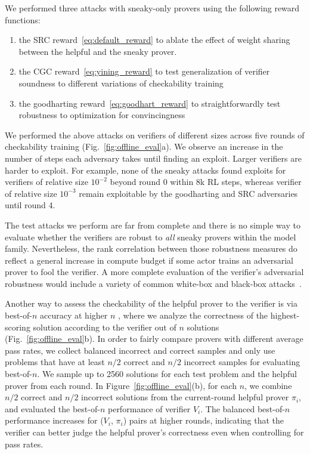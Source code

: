 \documentclass{article}
\begin{document}
We performed three attacks with sneaky-only provers using the following reward functions:
\begin{enumerate}
    \item  the SRC reward~\eqref{eq:default_reward} to ablate the effect of weight sharing between the helpful and the sneaky prover.
    \item the CGC reward~\eqref{eq:yining_reward} to test generalization of verifier soundness to different variations of checkability training
    \item the goodharting reward~\eqref{eq:goodhart_reward} to straightforwardly test robustness to optimization for convincingness \citep{gao2023scaling}
\end{enumerate}
We performed the above attacks on verifiers of different sizes across five rounds of checkability training (Fig.~\ref{fig:offline_eval}a). We observe an increase in the number of steps each adversary takes until finding an exploit. Larger verifiers are harder to exploit. For example, none of the sneaky attacks found exploits for verifiers of relative size $10^{-2}$ beyond round 0 within 8k RL steps, whereas verifier of relative size $10^{-3}$ remain exploitable by the goodharting and SRC adversaries until round 4.

The test attacks we perform are far from complete and there is no simple way to evaluate whether the verifiers are robust to {\em all} sneaky provers within the model family. Nevertheless, the rank correlation between those robustness measures do reflect a general increase in compute budget if some actor trains an adversarial prover to fool the verifier. A more complete evaluation of the verifier's adversarial robustness would include a variety of common white-box and black-box attacks~\citep{zou2023universal,shah2023scalable, hayase2024query}.

Another way to assess the checkability of the helpful prover to the verifier is via best-of-$n$ accuracy at higher $n$ \citep{gao2023scaling}, where we analyze the correctness of the highest-scoring solution according to the verifier out of $n$ solutions (Fig.~\ref{fig:offline_eval}b). In order to fairly compare provers with different average pass rates, we collect balanced incorrect and correct samples and only use problems that have at least $n/2$ correct and $n/2$ incorrect samples for evaluating best-of-$n$. We sample up to 2560 solutions for each test problem and the helpful prover from each round. In Figure~\ref{fig:offline_eval}(b), for each $n$, we combine $n/2$ correct and $n/2$ incorrect solutions from the current-round helpful prover $\pi_i$, and evaluated the best-of-$n$ performance of verifier $V_i$. The balanced best-of-$n$ performance increases for ($V_i$, $\pi_i$) pairs at higher rounds, indicating that the verifier can better judge the helpful prover's correctness even when controlling for pass rates. 
\end{document}
